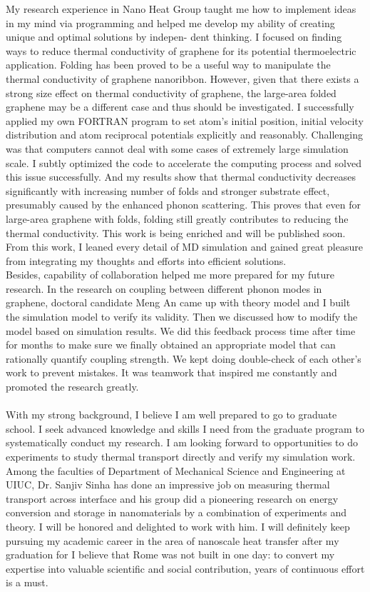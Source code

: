 \documentclass[a4paper,10pt]{article}
\begin{document}
\begin{spacing}{1.5}
My research experience in Nano Heat Group  taught me how to implement ideas in my mind via programming and helped me develop my ability of creating unique and optimal solutions by indepen- dent thinking. I focused on finding ways to reduce thermal conductivity of graphene for its potential thermoelectric application. Folding has been proved to be a useful way to manipulate the thermal conductivity of graphene nanoribbon. However, given that there exists a strong size effect on thermal conductivity of graphene, the large-area folded graphene may be a different case and thus should be investigated. I successfully applied my own FORTRAN program to set atom’s initial position, initial velocity distribution and atom reciprocal potentials explicitly and reasonably. Challenging was that computers cannot deal with some cases of extremely large simulation scale. I subtly optimized the code to accelerate the computing process and solved this issue successfully. And my results show that thermal conductivity decreases significantly with increasing number of folds and stronger substrate effect, presumably caused by the enhanced phonon scattering. This proves that even for large-area graphene with folds, folding still greatly contributes to reducing the thermal conductivity. This work is being enriched and will be published soon. From this work, I leaned every detail of MD simulation and gained great pleasure from integrating my thoughts and efforts into efficient solutions.
\\
Besides, capability of collaboration helped me more prepared for my future research. In the research on coupling between different phonon modes in graphene, doctoral candidate Meng An came up with theory model and I built the simulation model to verify its validity. Then we discussed how to modify the model based on simulation results. We did this feedback process time after time for months to make sure we finally obtained an appropriate model that can rationally quantify coupling strength. We kept doing double-check of each other’s work to prevent mistakes. It was teamwork that inspired me constantly and promoted the research greatly.\\
\\
With my strong background, I believe I am well prepared to go to graduate school. I seek advanced knowledge and skills I need from the graduate program to systematically conduct my research. I am looking forward to opportunities to do experiments to study thermal transport directly and verify my simulation work. Among the faculties of Department of Mechanical Science and Engineering at UIUC, Dr. Sanjiv Sinha has done an impressive job on measuring thermal transport across interface and his group did a pioneering research on energy conversion and storage in nanomaterials by a combination of experiments and theory. I will be honored and delighted to work with him. I will definitely keep pursuing my academic career in the area of nanoscale heat transfer after my graduation for I believe that Rome was not built in one day: to convert my expertise into valuable scientific and social contribution, years of continuous effort is a must.\\

\end{spacing}
\end{document}
